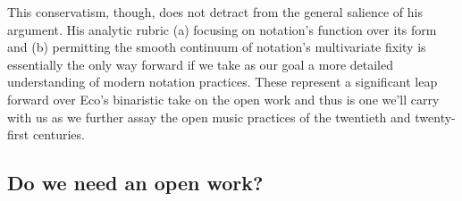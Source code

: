     This conservatism, though, does not detract from the general salience of his argument. His analytic rubric (a) focusing on notation's function over its form and (b) permitting the smooth continuum of notation's multivariate fixity is essentially the only way forward if we take as our goal a more detailed understanding of modern notation practices. These represent a significant leap forward over Eco's binaristic take on the open work and thus is one we'll carry with us as we further assay the open music practices of the twentieth and twenty-first centuries. 




    
    


\subsection{Do we need an open work?}

